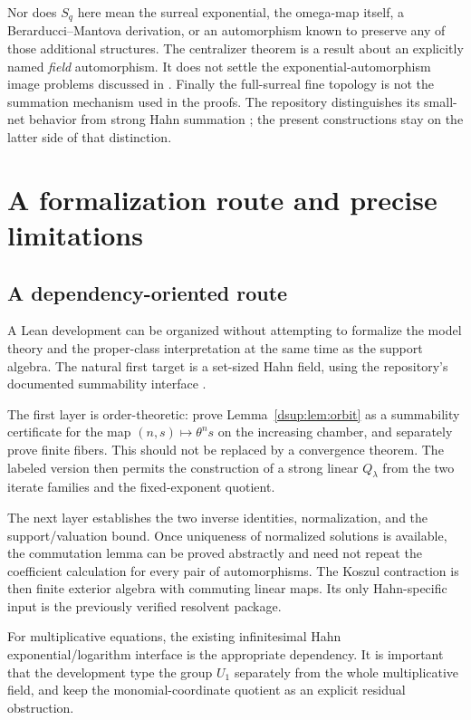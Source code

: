 \documentclass[11pt,oneside]{article}
\numberwithin{equation}{section}
\theoremstyle{definition}
\theoremstyle{remark}
\begin{document}
Nor does $S_q$ here mean the surreal exponential, the omega-map itself,
a Berarducci--Mantova derivation, or an automorphism known to preserve
any of those additional structures. The centralizer theorem is a result
about an explicitly named \emph{field} automorphism. It does not settle
the exponential-automorphism image problems discussed in \cite{KKS,RepoAut}.
Finally the full-surreal fine topology is not the summation mechanism
used in the proofs. The repository distinguishes its small-net behavior
from strong Hahn summation \cite{RepoDocs}; the present constructions stay
on the latter side of that distinction.

\section{A formalization route and precise limitations}\label{dsup:sec:formalization}

\subsection{A dependency-oriented route}

A Lean development can be organized without attempting to formalize the
model theory and the proper-class interpretation at the same time as the
support algebra. The natural first target is a set-sized Hahn field,
using the repository's documented summability interface \cite{Repo}.

The first layer is order-theoretic: prove
Lemma~\ref{dsup:lem:orbit} as a summability certificate for the map
$(n,s)\mapsto\theta^ns$ on the increasing chamber, and separately prove
finite fibers. This should not be replaced by a convergence theorem.
The labeled version then permits the construction of a strong linear
$Q_\lambda$ from the two iterate families and the fixed-exponent quotient.

The next layer establishes the two inverse identities, normalization,
and the support/valuation bound. Once uniqueness of normalized solutions
is available, the commutation lemma can be proved abstractly and need
not repeat the coefficient calculation for every pair of automorphisms.
The Koszul contraction is then finite exterior algebra with commuting
linear maps. Its only Hahn-specific input is the previously verified
resolvent package.

For multiplicative equations, the existing infinitesimal Hahn
exponential/logarithm interface is the appropriate dependency. It is
important that the development type the group $U_1$ separately from the
whole multiplicative field, and keep the monomial-coordinate quotient
as an explicit residual obstruction.
\end{document}
